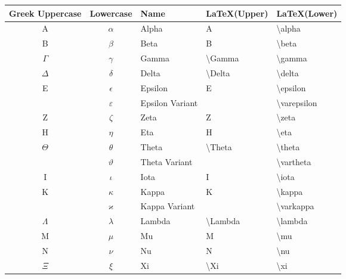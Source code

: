 \begin{table}[!htb]
\begin{tabularx}{\linewidth}{ c c l l l } \hline
  Greek Uppercase & Lowercase     & Name            & \LaTeX (Upper)         & \LaTeX (Lower) \\
  \hline
  A               & $\alpha$      & Alpha           & A                      & \textbackslash alpha \\
  B               & $\beta$       & Beta            & B                      & \textbackslash beta \\
  $\Gamma$        & $\gamma$      & Gamma           & \textbackslash Gamma   & \textbackslash gamma \\
  $\Delta$        & $\delta$      & Delta           & \textbackslash Delta   & \textbackslash delta \\
  E               & $\epsilon$    & Epsilon         & E                      & \textbackslash epsilon \\
                  & $\varepsilon$ & Epsilon Variant &                        & \textbackslash varepsilon \\
  Z               & $\zeta$       & Zeta            & Z                      & \textbackslash zeta \\
  H               & $\eta$        & Eta             & H                      & \textbackslash eta \\
  $\Theta$        & $\theta$      & Theta           & \textbackslash Theta   & \textbackslash theta \\
                  & $\vartheta$   & Theta Variant   &                        & \textbackslash vartheta \\
  I               & $\iota$       & Iota            & I                      & \textbackslash iota \\
  K               & $\kappa$      & Kappa           & K                      & \textbackslash kappa \\
                  & $\varkappa$   & Kappa Variant   &                        & \textbackslash varkappa \\
  $\Lambda$       & $\lambda$     & Lambda          & \textbackslash Lambda  & \textbackslash lambda \\
  M               & $\mu$         & Mu              & M                      & \textbackslash mu \\
  N               & $\nu$         & Nu              & N                      & \textbackslash nu \\
  $\Xi$           & $\xi$         & Xi              & \textbackslash Xi      & \textbackslash xi \\

\end{tabularx}
\end{table}
